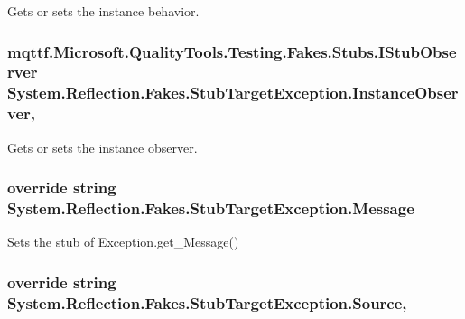 Gets or sets the instance behavior.

\hypertarget{class_system_1_1_reflection_1_1_fakes_1_1_stub_target_exception_a20fb3b861fa12947706f54189f1358f4}{
\subsubsection[{Instance\-Observer}]{\setlength{\rightskip}{0pt plus 5cm}mqttf.\-Microsoft.\-Quality\-Tools.\-Testing.\-Fakes.\-Stubs.\-I\-Stub\-Observer System.\-Reflection.\-Fakes.\-Stub\-Target\-Exception.\-Instance\-Observer\hspace{0.3cm}{\ttfamily [get]}, {\ttfamily [set]}}}\label{class_system_1_1_reflection_1_1_fakes_1_1_stub_target_exception_a20fb3b861fa12947706f54189f1358f4}


Gets or sets the instance observer.

\hypertarget{class_system_1_1_reflection_1_1_fakes_1_1_stub_target_exception_a8f38f94b695861c833474c2290cabc0b}{
\subsubsection[{Message}]{\setlength{\rightskip}{0pt plus 5cm}override string System.\-Reflection.\-Fakes.\-Stub\-Target\-Exception.\-Message\hspace{0.3cm}{\ttfamily [get]}}}\label{class_system_1_1_reflection_1_1_fakes_1_1_stub_target_exception_a8f38f94b695861c833474c2290cabc0b}


Sets the stub of Exception.\-get\-\_\-\-Message()

\hypertarget{class_system_1_1_reflection_1_1_fakes_1_1_stub_target_exception_ac32401e5464f3653d24c16dd7b7cbb32}{
\subsubsection[{Source}]{\setlength{\rightskip}{0pt plus 5cm}override string System.\-Reflection.\-Fakes.\-Stub\-Target\-Exception.\-Source\hspace{0.3cm}{\ttfamily [get]}, {\ttfamily [set]}}}\label{class_system_1_1_reflection_1_1_fakes_1_1_stub_target_exception_ac32401e5464f3653d24c16dd7b7cbb32}



